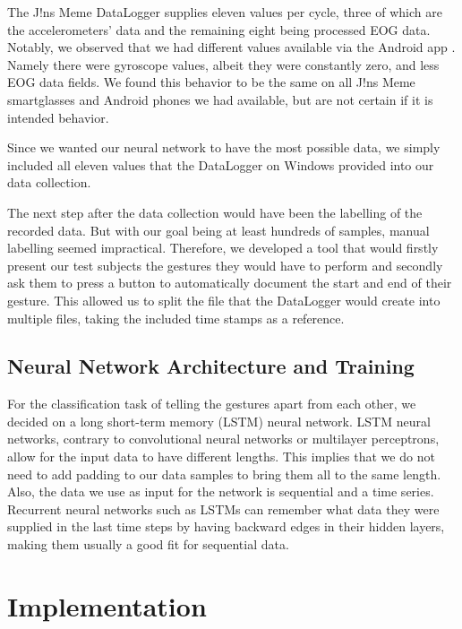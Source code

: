\documentclass[runningheads]{llncs}
\begin{document}
The J!ns Meme DataLogger supplies eleven values per cycle, three of which are the
accelerometers' data and the remaining eight being processed EOG data.
Notably, we observed that we had different values available via the Android app
\cite{jinsMemeDataLoggerAndroid}. Namely there were gyroscope values, albeit they
were constantly zero, and less EOG data fields.
We found this behavior to be the same on all J!ns Meme smartglasses and Android phones
we had available, but are not certain if it is intended behavior.

Since we wanted our neural network to have the most possible data, we simply included all
eleven values that the DataLogger on Windows provided into our data collection.

The next step after the data collection would have been the labelling of the recorded data.
But with our goal being at least hundreds of samples, manual labelling seemed impractical.
Therefore, we developed a tool that would firstly present our test subjects the
gestures they would have to perform and secondly ask them to press a button to
automatically document the start and end of their gesture. This allowed us to split the
file that the DataLogger would create into multiple files, taking the included time
stamps as a reference.

\subsection{Neural Network Architecture and Training} \label{subsec:nnArchAndTraining}
For the classification task of telling the gestures apart from each other, we decided on
a long short-term memory (LSTM) neural network. LSTM neural networks, contrary to convolutional neural networks
or multilayer perceptrons, allow for the input data to have different lengths. This
implies that we do not need to add padding to our data samples to bring them all to the
same length. Also, the data we use as input for the network is sequential and a time
series. Recurrent neural networks such as LSTMs can remember what data they were supplied
in the last time steps by having backward edges in their hidden layers, making them
usually a good fit for sequential data.

\section{Implementation}
\end{document}
